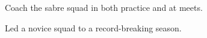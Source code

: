 \documentclass[letterpaper]{deedy-resume} %
\begin{document}
\begin{minipage}[t]{0.39\textwidth}
\sectionspace 



\begin{tightitemize}
	\item Coach the sabre squad in both practice and at meets.
	\item Led a novice squad to a record-breaking season.
\end{tightitemize}

\sectionspace






\end{minipage} %
\hfill
%
%
\end{document}
